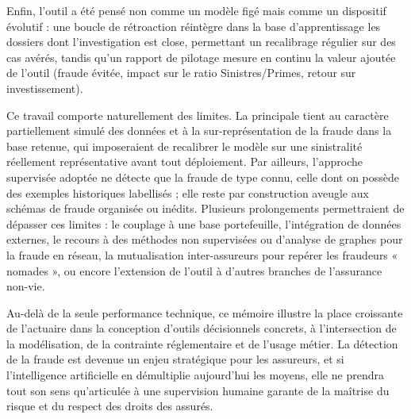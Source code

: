 Enfin, l'outil a été pensé non comme un modèle figé mais comme un dispositif évolutif : une boucle de rétroaction réintègre dans la base d'apprentissage les dossiers dont l'investigation est close, permettant un recalibrage régulier sur des cas avérés, tandis qu'un rapport de pilotage mesure en continu la valeur ajoutée de l'outil (fraude évitée, impact sur le ratio Sinistres/Primes, retour sur investissement).

Ce travail comporte naturellement des limites. La principale tient au caractère partiellement simulé des données et à la sur-représentation de la fraude dans la base retenue, qui imposeraient de recalibrer le modèle sur une sinistralité réellement représentative avant tout déploiement. Par ailleurs, l'approche supervisée adoptée ne détecte que la fraude de type connu, celle dont on possède des exemples historiques labellisés ; elle reste par construction aveugle aux schémas de fraude organisée ou inédits. Plusieurs prolongements permettraient de dépasser ces limites : le couplage à une base portefeuille, l'intégration de données externes, le recours à des méthodes non supervisées ou d'analyse de graphes pour la fraude en réseau, la mutualisation inter-assureurs pour repérer les fraudeurs « nomades », ou encore l'extension de l'outil à d'autres branches de l'assurance non-vie.

Au-delà de la seule performance technique, ce mémoire illustre la place croissante de l'actuaire dans la conception d'outils décisionnels concrets, à l'intersection de la modélisation, de la contrainte réglementaire et de l'usage métier. La détection de la fraude est devenue un enjeu stratégique pour les assureurs, et si l'intelligence artificielle en démultiplie aujourd'hui les moyens, elle ne prendra tout son sens qu'articulée à une supervision humaine garante de la maîtrise du risque et du respect des droits des assurés.